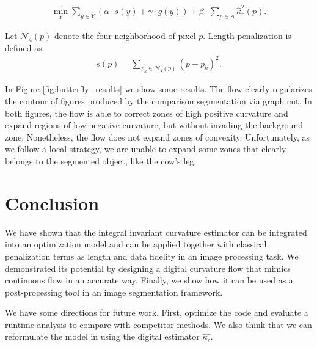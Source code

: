 \documentclass[runningheads]{llncs}
\begin{document}
\begin{align}			
	\min_{Y} \sum_{y \in Y}{\left( \alpha \cdot s(y) + \gamma \cdot g(y) \right)} + \beta \cdot \sum_{p \in A}{\hat{\kappa}_{r}^2(p)}.
	\label{eq:boundary-correction-energy}
\end{align}
	
	Let $\mathcal{N}_4(p)$ denote the four neighborhood of pixel $p$. Length penalization is defined as
	\begin{align*}
		s(p)=\sum_{p_k \in \mathcal{N}_4(p)}{ (p-p_k) }^2.
	\end{align*}


        In Figure \ref{fig:butterfly_results} we show some results. The flow clearly regularizes the contour of figures
        produced by the comparison segmentation via graph cut. In both figures, the flow is able to correct zones of high positive
        curvature and expand regions of low negative curvature, but without invading the background zone. Nonetheless,
        the flow does not expand zones of convexity. Unfortunately, as we follow a local strategy, we are unable to expand
        some zones that clearly belongs to the segmented object, like the cow's leg.

\section{Conclusion}
We have shown that the integral invariant curvature estimator can be integrated into an optimization model and can be
applied together with classical penalization terms as length and data fidelity in an image processing task. We
demonstrated its potential by designing a digital curvature flow that mimics continuous flow in an accurate way. Finally, we show how it can be used as a post-processing tool in an image segmentation framework.

We have some directions for future work. First, optimize the code and evaluate a runtime analysis to compare with
competitor methods. We also think that we can reformulate the model in \cite{schoenemann09} using the digital estimator
$\hat{\kappa_r}$. %
	
\end{document}
